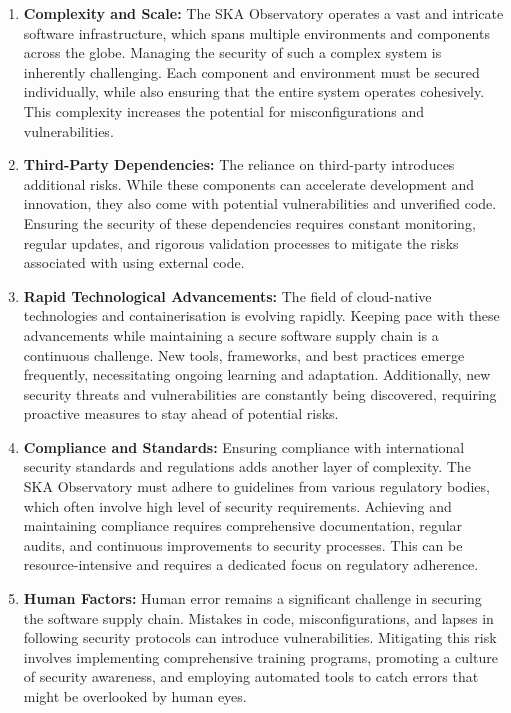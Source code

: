 \documentclass[a4paper]{spie}  %
\begin{document}
\begin{enumerate}

    \item \textbf{Complexity and Scale:} The SKA Observatory operates a vast and intricate software infrastructure, which spans multiple environments and components across the globe. Managing the security of such a complex system is inherently challenging. Each component and environment must be secured individually, while also ensuring that the entire system operates cohesively. This complexity increases the potential for misconfigurations and vulnerabilities.

    \item \textbf{Third-Party Dependencies:} The reliance on third-party introduces additional risks. While these components can accelerate development and innovation, they also come with potential vulnerabilities and unverified code. Ensuring the security of these dependencies requires constant monitoring, regular updates, and rigorous validation processes to mitigate the risks associated with using external code.

    \item \textbf{Rapid Technological Advancements:} The field of cloud-native technologies and containerisation is evolving rapidly. Keeping pace with these advancements while maintaining a secure software supply chain is a continuous challenge. New tools, frameworks, and best practices emerge frequently, necessitating ongoing learning and adaptation. Additionally, new security threats and vulnerabilities are constantly being discovered, requiring proactive measures to stay ahead of potential risks.

    \item \textbf{Compliance and Standards:} Ensuring compliance with international security standards and regulations adds another layer of complexity. The SKA Observatory must adhere to guidelines from various regulatory bodies, which often involve high level of security requirements. Achieving and maintaining compliance requires comprehensive documentation, regular audits, and continuous improvements to security processes. This can be resource-intensive and requires a dedicated focus on regulatory adherence.

    \item \textbf{Human Factors:} Human error remains a significant challenge in securing the software supply chain. Mistakes in code, misconfigurations, and lapses in following security protocols can introduce vulnerabilities. Mitigating this risk involves implementing comprehensive training programs, promoting a culture of security awareness, and employing automated tools to catch errors that might be overlooked by human eyes.

\end{enumerate}
\end{document}
